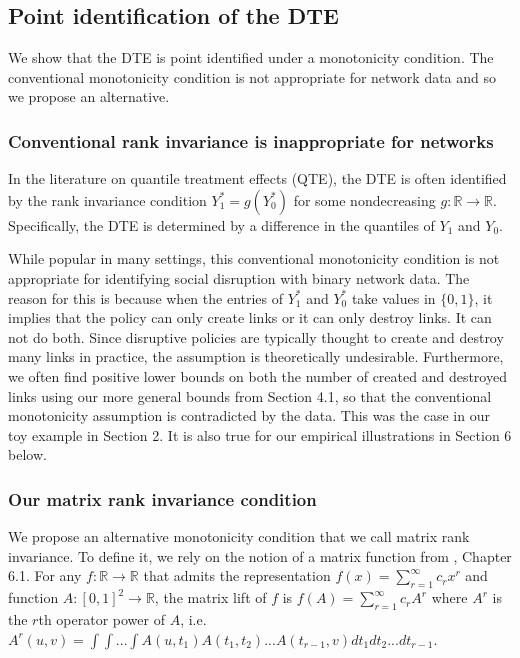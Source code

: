 \documentclass[12pt]{article}
\theoremstyle{definition}
\begin{document}
\subsection{Point identification of the DTE}
We show that the DTE is point identified under a monotonicity condition. The conventional monotonicity condition is not appropriate for network data and so we propose an alternative.  

\subsubsection{Conventional rank invariance is inappropriate for networks}
In the literature on quantile treatment effects (QTE), the DTE is often identified by the rank invariance condition $Y_{1}^{*} = g(Y_{0}^{*})$ for some nondecreasing $g: \mathbb{R} \to \mathbb{R}$. Specifically, the DTE is determined by a difference in the quantiles of $Y_{1}$ and $Y_{0}$.  

While popular in many settings, this conventional monotonicity condition is not appropriate for identifying social disruption with binary network data. The reason for this is because when the entries of $Y^{*}_{1}$ and $Y^{*}_{0}$ take values in $\{0,1\}$, it implies that the policy can only create links or it can only destroy links. It can not do both. Since disruptive policies are typically thought to create and destroy many links in practice, the assumption is theoretically undesirable. Furthermore, we often find positive lower bounds on both the number of created and destroyed links using our more general bounds from Section 4.1, so that the conventional monotonicity assumption is contradicted by the data. This was the case in our toy example in Section 2. It is also true for our empirical illustrations in Section 6 below.   

\subsubsection{Our matrix rank invariance condition}
We propose an alternative monotonicity condition that we call matrix rank invariance. To define it, we rely on the notion of a matrix function from \cite{horn1991topics}, Chapter 6.1. For any $f: \mathbb{R} \to \mathbb{R}$ that admits the representation $f(x) = \sum_{r=1}^{\infty}c_{r}x^{r}$ and function $A: [0,1]^{2}\to\mathbb{R}$, the matrix lift of $f$ is $f(A) = \sum_{r=1}^{\infty}c_{r}A^{r}$ where $A^{r}$ is the $r$th operator power of $A$, i.e. $A^{r}(u,v) = \int\int...\int A(u,t_{1})A(t_{1},t_{2})...A(t_{r-1},v)dt_{1}dt_{2}...dt_{r-1}$.  
\end{document}
